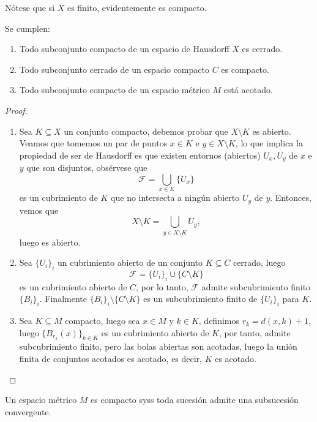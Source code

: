 \documentclass[11pt,oneside,a4paper]{book}
\begin{document}
Nótese que si $X$ es finito, evidentemente es compacto.
\begin{thm}
Se cumplen:
\begin{enumerate}[$a)$]
\item Todo subconjunto compacto de un espacio de Hausdorff $X$ es cerrado.
\item Todo subconjunto cerrado de un espacio compacto $C$ es compacto.
\item Todo subconjunto compacto de un espacio métrico $M$ está acotado.
\end{enumerate}
\end{thm}
\begin{proof}
\begin{enumerate}[$a)$]
\item Sea $K\subseteq X$ un conjunto compacto, debemos probar que $X\setminus K$ es abierto. Veamos que tomemos un par de puntos $x\in K$ e $y\in X\setminus K$, lo que implica la propiedad de ser de Hausdorff es que existen entornos (abiertos) $U_x,U_y$ de $x$ e $y$ que son disjuntos, obsérvese que
$$\mathcal{F}=\bigcup_{x\in K}\{U_x\}$$
es un cubrimiento de $K$ que no intersecta a ningún abierto $U_y$ de $y$. Entonces, vemos que
$$X\setminus K=\bigcup_{y\in X\setminus K}U_y,$$
luego es abierto.
\item Sea $\{U_i\}_i$ un cubrimiento abierto de un conjunto $K\subseteq C$ cerrado, luego
$$\mathcal{F}=\{U_i\}_i\cup\{C\setminus K\}$$
es un cubrimiento abierto de $C$, por lo tanto, $\mathcal{F}$ admite subcubrimiento finito $\{B_i\}_i$. Finalmente $\{B_i\}_i\setminus\{C\setminus K\}$ es un subcubrimiento finito de $\{U_i\}_i$ para $K$.
\item Sea $K\subseteq M$ compacto, luego sea $x\in M$ y $k\in K$, definimos $r_k=d(x,k)+1$, luego $\{B_{r_k}(x)\}_{k\in K}$ es un cubrimiento abierto de $K$, por tanto, admite subcubrimiento finito, pero las bolas abiertas son acotadas, luego la unión finita de conjuntos acotados es acotado, es decir, $K$ es acotado.
\end{enumerate}
\end{proof}
\begin{thm}
Un espacio métrico $M$ es compacto syss toda sucesión admite una subsucesión convergente.
\end{thm}
\end{document}
